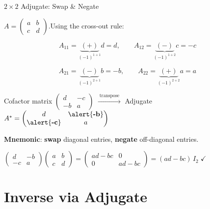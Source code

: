 \documentclass[10pt]{beamer}
\theoremstyle{definition}
\newcommand{\x}[1]{\alert{\textbf{#1}}}
\begin{document}
\begin{frame}{$2\times 2$ Adjugate: Swap \& Negate}

$A = \begin{pmatrix}a&b\\c&d\end{pmatrix}$.\quad Using the cross-out rule:

\vfill

$$A_{11} = \underbrace{(+)}_{(-1)^{1+1}} d = d, \qquad
A_{12} = \underbrace{(-)}_{(-1)^{1+2}} c = -c$$

$$A_{21} = \underbrace{(-)}_{(-1)^{2+1}} b = -b, \qquad
A_{22} = \underbrace{(+)}_{(-1)^{2+2}} a = a$$

\vfill

Cofactor matrix $\begin{pmatrix}d&-c\\-b&a\end{pmatrix}$
\;$\xrightarrow{\;\text{transpose}\;}$\;
Adjugate $A^* = \begin{pmatrix}d&\x{-b}\\\x{-c}&a\end{pmatrix}$

\vfill

\x{Mnemonic}: \textbf{swap} diagonal entries, \textbf{negate} off-diagonal entries.

\vfill

$\begin{pmatrix}d&-b\\-c&a\end{pmatrix}\!\begin{pmatrix}a&b\\c&d\end{pmatrix} = \begin{pmatrix}ad-bc&0\\0&ad-bc\end{pmatrix} = (ad-bc)\,I_2 \;\checkmark$

\end{frame}


\section{Inverse via Adjugate}
\end{document}
